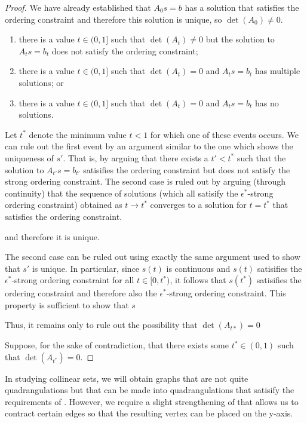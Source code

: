 \documentclass{patmorin}
\begin{document}
\begin{proof}
   We have already established that $A_0s=b$ has a solution that satisfies
   the ordering constraint and therefore this solution is unique, so
   $\det(A_0)\neq 0$.
   \begin{enumerate}
     \item there is a value $t\in(0,1]$ such that $\det(A_t)\neq 0$ but
     the solution to $A_t s=b_t$ does not satisfy the ordering constraint;
     \item there is a value $t\in(0,1]$ such that $\det(A_t)=0$ and $A_t
     s=b_t$ has multiple solutions; or
     \item there is a value $t\in(0,1]$ such that $\det(A_t)=0$ and $A_t
     s=b_t$ has no solutions.
   \end{enumerate}
   Let $t^*$ denote the minimum value $t<1$ for which one of these
   events occurs.  We can rule out the first event by an argument
   similar to the one which shows the uniqueness of $s'$.  That is,
   by arguing that there exists a $t'<t^*$ such that the solution to
   $A_{t'}s=b_{t'}$ satisifies the ordering constraint but does not
   satisfy the strong ordering constraint.  The second case is ruled out
   by arguing (through continuity) that the sequence of solutions (which all satisify the $\epsilon^*$-strong ordering constraint) obtained as $t\to t^*$ converges to a solution for $t=t^*$ that satisfies the ordering constraint.


 and therefore it is unique.


The second case can be
   ruled out using exactly the same argument used to show that $s'$ is
   unique. In particular, since $s(t)$ is continuous and $s(t)$ satisifies
   the $\epsilon^*$-strong ordering constraint for all $t\in[0,t^*)$,
   it follows that $s(t^*)$ satisifies the ordering constraint and
   therefore also the $\epsilon^*$-strong ordering constraint.  This property is sufficient to show that $s$ 

   Thus, it remains only to rule out the possibility that $\det(A_{t*})=0$ 

Suppose, for the
   sake of contradiction, that there exists some $t^*\in(0,1)$ such
   that $\det(A_{t^*})=0$.  



\end{proof}

In studying collinear sets, we will obtain graphs that are not quite
quadrangulations but that can be made into quadrangulations that
satisify the requirements of . However, we require a slight
strengthening of  that allows us to contract certain edges
so that the resulting vertex can be placed on the y-axis.
\end{document}
